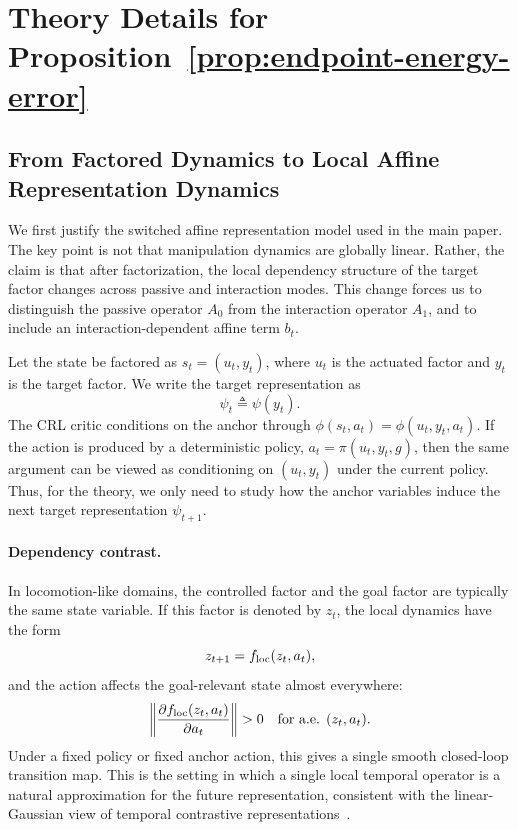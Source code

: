 \section{Theory Details for Proposition~\ref{prop:endpoint-energy-error}}
\label{app:theory}
\label{app:one-reset-error}

\newtheorem{corollary}{Corollary}[section]

\subsection{From Factored Dynamics to Local Affine Representation Dynamics}
\label{subsec:local-affine-dynamics}

We first justify the switched affine representation model used in the main paper.
The key point is not that manipulation dynamics are globally linear.
Rather, the claim is that after factorization, the local dependency structure of the target factor changes across passive and interaction modes.
This change forces us to distinguish the passive operator $A_0$ from the interaction operator $A_1$, and to include an interaction-dependent affine term $b_t$.

Let the state be factored as $s_t=(u_t,y_t)$, where $u_t$ is the actuated factor and $y_t$ is the target factor.
We write the target representation as
\[
    \psi_t \triangleq \psi(y_t).
\]
The CRL critic conditions on the anchor through $\phi(s_t,a_t)=\phi(u_t,y_t,a_t)$.
If the action is produced by a deterministic policy, $a_t=\pi(u_t,y_t,g)$, then the same argument can be viewed as conditioning on $(u_t,y_t)$ under the current policy.
Thus, for the theory, we only need to study how the anchor variables induce the next target representation $\psi_{t+1}$.

\paragraph{Dependency contrast.}
In locomotion-like domains, the controlled factor and the goal factor are typically the same state variable.
If this factor is denoted by $z_t$, the local dynamics have the form
\[
    z_{t+1}=f_{\rm loc}(z_t,a_t),
\]
and the action affects the goal-relevant state almost everywhere:
\[
    \left\|
    \frac{\partial f_{\rm loc}(z_t,a_t)}{\partial a_t}
    \right\|
    >0
    \quad
    \text{for a.e. } (z_t,a_t).
\]
Under a fixed policy or fixed anchor action, this gives a single smooth closed-loop transition map.
This is the setting in which a single local temporal operator is a natural approximation for the future representation, consistent with the linear-Gaussian view of temporal contrastive representations~\citep{eysenbach2024inference}.

